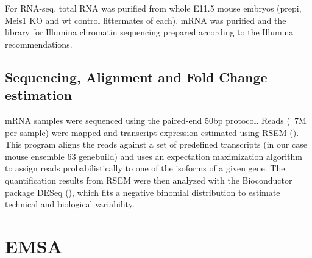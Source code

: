 For RNA-seq, total RNA was purified from whole E11.5 mouse embryos (\ac{prepi}, Meis1 \ac{KO} and wt control littermates of each). mRNA was purified and the library for Illumina chromatin sequencing prepared according to the Illumina recommendations.

\subsection{Sequencing, Alignment and Fold Change estimation}

mRNA samples were sequenced using the paired-end 50bp protocol. Reads (~7M per sample) were mapped and transcript expression estimated using RSEM (\cite{Li2011}). This program aligns the reads against a set of predefined transcripts (in our case mouse ensemble 63 genebuild) and uses an expectation maximization algorithm to assign reads probabilistically to one of the isoforms of a given gene. The quantification results from RSEM were then analyzed with the Bioconductor package DESeq (\cite{Anders2010}), which fits a negative binomial distribution to estimate technical and biological variability.


\section{EMSA}


